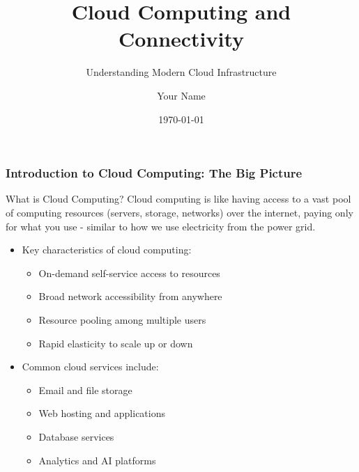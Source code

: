 \documentclass{beamer}
\title{Cloud Computing and Connectivity}
\subtitle{Understanding Modern Cloud Infrastructure}
\author{Your Name}
\institute{Institution Name}
\date{\today}
\begin{document}
\begin{frame}
    \titlepage
\end{frame}

\begin{frame}
    \frametitle{Introduction to Cloud Computing: The Big Picture}
    
    \begin{alertblock}{What is Cloud Computing?}
        Cloud computing is like having access to a vast pool of computing resources (servers, storage, networks) over the internet, paying only for what you use - similar to how we use electricity from the power grid.
    \end{alertblock}
    
    \begin{itemize}
        \item Key characteristics of cloud computing:
        \begin{itemize}
            \item On-demand self-service access to resources
            \item Broad network accessibility from anywhere
            \item Resource pooling among multiple users
            \item Rapid elasticity to scale up or down
        \end{itemize}
        
        \item Common cloud services include:
        \begin{itemize}
            \item Email and file storage
            \item Web hosting and applications
            \item Database services
            \item Analytics and AI platforms
        \end{itemize}
    \end{itemize}
\end{frame}
\end{document}

